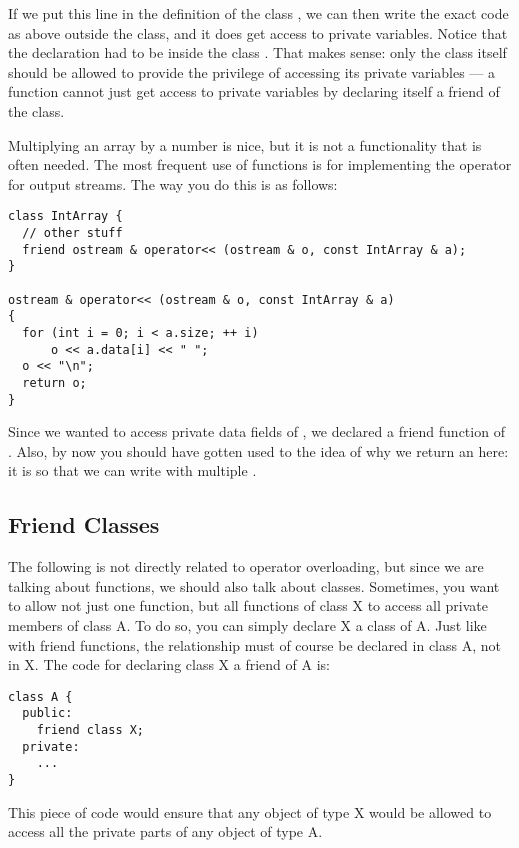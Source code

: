 If we put this line in the definition of the class ,
we can then write the exact code as above outside the class,
and it does get access to private variables.
Notice that the  declaration had to be inside the class
.
That makes sense: only the class itself should be allowed to provide
the privilege of accessing its private variables --- a function cannot
just get access to private variables by declaring itself a friend of
the class.


Multiplying an array by a number is nice, but it is not a
functionality that is often needed.
The most frequent use of  functions is for implementing
the \code{<<} operator for output streams.
The way you do this is as follows:

\begin{verbatim}
class IntArray {
  // other stuff
  friend ostream & operator<< (ostream & o, const IntArray & a);
}

ostream & operator<< (ostream & o, const IntArray & a)
{ 
  for (int i = 0; i < a.size; ++ i)
      o << a.data[i] << " ";
  o << "\n";
  return o;
}
\end{verbatim}

Since we wanted to access private data fields of ,
we declared \code{<<} a friend function of .
Also, by now you should have gotten used to the idea of why we return
an  here: it is so that we can write
with multiple \code{<<}.

\subsection{Friend Classes}
The following is not directly related to operator overloading,
but since we are talking about  functions,
we should also talk about  classes.
Sometimes, you want to allow not just one function,
but all functions of class X to access all private members of class A.
To do so, you can simply declare X a  class of A. 
Just like with friend functions, the  relationship must
of course be declared in class A, not in X. 
The code for declaring class X a friend of A is:

\begin{verbatim}
class A {
  public:
    friend class X;
  private:
    ...
}
\end{verbatim}

This piece of code would ensure that any object of type X would be
allowed to access all the private parts of any object of type A.

